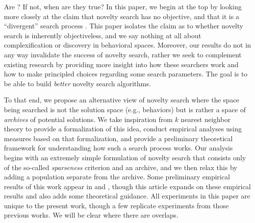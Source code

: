 \documentclass[twoside]{article}
\begin{document}

Are ?  If not, when are they true?  In this paper, we begin at the top by  looking more closely at the claim that novelty search has no objective, and that it is a ``divergent'' search process \citep{Lehman2016frai,Lehman2015gecco,StanleyLehman2015}.  This paper isolates the claim as to whether novelty search is inherently objectiveless, and we say nothing at all about complexification or discovery in behavioral spaces.  Moreover, our results do not in any way invalidate the success of novelty search, rather we seek to complement existing research by providing more insight into how these searchers work and how to make principled choices regarding some search parameters.  The goal is to be able to build \emph{better} novelty search algorithms.

To that end, we propose an alternative view of novelty search where the space being searched is not the solution space (e.g., behaviors) but is rather a space of \emph{archives} of potential solutions.  We take inspiration from $k$ nearest neighbor theory to provide a formalization of this idea, conduct empirical analyses using measures based on that formalization, and provide a preliminary theoretical framework for understanding how such a search process works.  Our analysis begins with an extremely simple formulation of novelty search that consists only of the so-called \emph{sparseness} criterion and an archive, and we then relax this by adding a population separate from the archive.  Some preliminary empirical results of this work appear in \citet{Wiegand2020flairs} and \citet{Wiegand2021flairs}, though this article expands on these empirical results and also adds some theoretical guidance.  All experiments in this paper are unique to the present work, though a few replicate experiments from those previous works.  We will be clear where there are overlaps.
\end{document}
